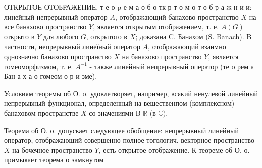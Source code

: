 \documentclass[10pt]{article}
\begin{document}
ОТКРЫТОЕ ОТОБРАЖЕНИЕ, т е о $\mathrm{p}$ е $м$ а о б о тк р т о м о т о б р а ж н и и: линейный непрерывный оператор $A$, отображающий банахово пространство $X$ на все банахово пространство $Y$, является открытым отображением, т. е. $A(G)$ открыто в $Y$ для любого $G$, открытого в $X$; доказана C. Банахом (S. Banach). B частности, непрерывный линеїный оператор $A$, отображающий взаимно однозначно банахово пространство $X$ на банахово пространство $Y$, является гомеоморфизмом, т. е. $A^{-1}$ - также линейный непрерывный оператор (те о рем а Бан а х а о гомеом о р и зме).



Условиям теоремы об О. о. удовлетворяет, например, всякий ненулевой линейный непрерывный функционал, определенный на вещественпом (комплексном) банаховом пространстве $X$ со значениями B $\mathbb{R}$ (в $\mathbb{C})$.



Теорема об О. о. допускает следующее обобщение: непрерывный линейный оператор, отображающий совершенно полное тогологич. векторное пространство $X$ на бочечное пространство $Y$, есть открытое отображение. $К$ теореме об О. о. примыкает теорема о замкнутом
\end{document}
